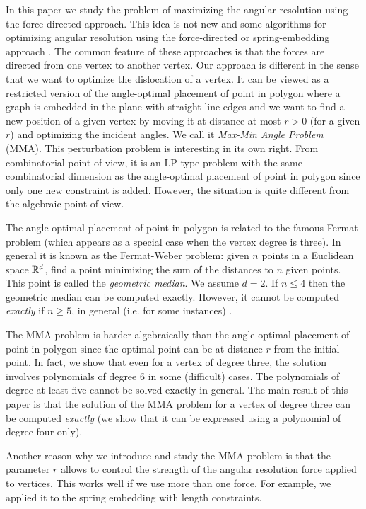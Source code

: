 \documentclass[10pt]{article}
\def\R{\ensuremath{\Bbb R}}
\begin{document}
In this paper we study the problem of maximizing the angular resolution using the force-directed approach.  This idea is not new and some algorithms for optimizing angular resolution using the force-directed or spring-embedding approach \cite{abs-mtrg-10,ccgkt-11}. The common feature of these approaches is that the forces  are directed from one vertex to another vertex. 
Our approach is different in the sense that we want to optimize the dislocation of a vertex. 
It can be viewed as a restricted version of the angle-optimal placement of point in polygon
where a graph is embedded in the plane with straight-line edges and we want to find a new position of a given vertex by moving it at distance at most $r>0$ (for a given $r$) and optimizing the incident angles. We call it {\em Max-Min Angle Problem} (MMA). 
This perturbation  problem is interesting in its own right. 
From combinatorial point of view, it is an LP-type problem with the same combinatorial 
dimension as the angle-optimal placement of point in polygon \cite{msw-96} since only one 
new constraint is added. However, the situation is quite different from the 
algebraic point of view.

The angle-optimal placement of point in polygon is related to the famous Fermat problem (which appears as a special case when the vertex degree is three). In general it is known as 
the Fermat-Weber problem: given $n$ points in a Euclidean space $\R^d$, find a point minimizing the sum of the distances to $n$ given points. This point is called the {\em geometric median}. We assume $d=2$. 
If $n\le 4$ then the geometric median can be computed exactly. However, it cannot be computed {\em exactly} if $n\ge 5$, in general (i.e. for some instances) \cite{b-ad-88}.  

The MMA problem is harder algebraically than the angle-optimal placement of point in polygon since the optimal point can be at distance $r$ from the initial point. 
In fact, we show that even for a vertex of degree three,  the solution involves polynomials of degree 6 in some (difficult) cases. The polynomials of degree at least five  cannot be solved exactly in general. The main result of this paper is that  the solution of the MMA problem for a vertex of degree three can be computed {\em exactly} (we show that it can be expressed using a polynomial of degree four only).

Another reason why we introduce and study the MMA problem is that the parameter $r$ allows to control the strength of the angular resolution force applied to vertices. This works well if we use more than one force. For example, we applied it to the spring embedding with length constraints. 
\end{document}
